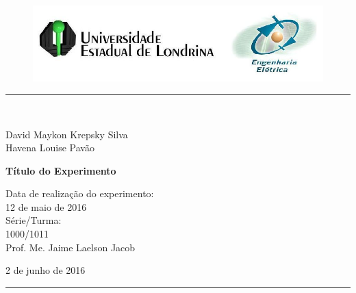 \begin{titlepage}
\begin{center}
\begin{figure}[h]
\includegraphics[scale=0.76]{Imagens/topdotitulo.png}
\end{figure}
\rule{\columnwidth}{1.5mm}
\

\large David Maykon Krepsky Silva\\
\large Havena Louise Pavão

\vspace{4cm}
{\bf \Large Título do Experimento}
\vspace{3.5cm}

\begin{flushright}
Data de realização do experimento:\\
12 de maio de 2016\\
Série/Turma:\\
1000/1011\\
Prof. Me. Jaime Laelson Jacob 
\end{flushright}

\vspace{3.2cm}
2 de junho de 2016

\rule{\columnwidth}{1.3mm}
\end{center}
\end{titlepage}